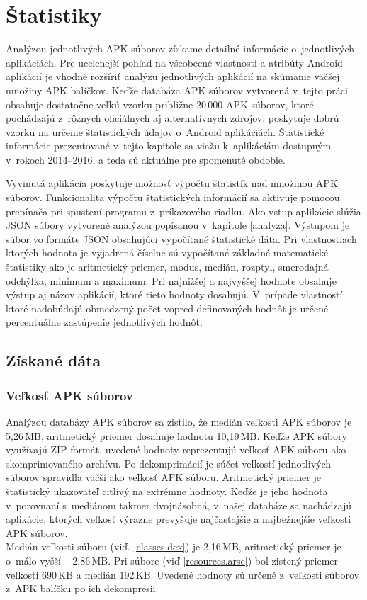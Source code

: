 \chapter{Štatistiky}
\label{statistiky}
Analýzou jednotlivých APK súborov získame detailné informácie o~jednotlivých aplikáciách. Pre ucelenejší pohľad na všeobecné vlastnosti a atribúty Android aplikácií je vhodné rozšíriť analýzu jednotlivých aplikácií na skúmanie väčšej množiny APK balíčkov. Keďže databáza APK súborov vytvorená v~tejto práci obsahuje dostatočne veľkú vzorku približne 20\,000 APK súborov, ktoré pochádzajú z~rôznych oficiálnych aj alternatívnych zdrojov, poskytuje dobrú vzorku na určenie štatistických údajov o~Android aplikáciách. Štatistické informácie prezentované v~tejto kapitole sa viažu k~aplikáciám dostupným v~rokoch 2014--2016, a teda sú aktuálne pre spomenuté obdobie.

Vyvinutá aplikácia  poskytuje možnosť výpočtu štatistík nad množinou APK súborov. Funkcionalita výpočtu štatistických informácií sa aktivuje pomocou prepínača  pri spustení programu z~príkazového riadku. Ako vstup aplikácie slúžia JSON súbory vytvorené analýzou popísanou v~kapitole \ref{analyza}. Výstupom je súbor vo formáte JSON obsahujúci vypočítané štatistické dáta. Pri vlastnostiach ktorých hodnota je vyjadrená číselne sú vypočítané základné matematické štatistiky ako je aritmetický priemer, modus, medián, rozptyl, smerodajná odchýlka, minimum a maximum. Pri najnižšej a najvyššej hodnote obsahuje výstup aj názov aplikácií, ktoré tieto hodnoty dosahujú. V~prípade vlastností ktoré nadobúdajú obmedzený počet vopred definovaných hodnôt je určené percentuálne zastúpenie jednotlivých hodnôt.

\section{Získané dáta}
\subsection{Veľkosť APK súborov}
Analýzou databázy APK súborov sa zistilo, že medián veľkosti APK súborov je 5,26\,MB, aritmetický priemer dosahuje hodnotu 10,19\,MB. Keďže APK súbory využívajú ZIP formát, uvedené hodnoty reprezentujú veľkosť APK súboru ako skomprimovaného archívu. Po dekomprimácií je súčet veľkostí jednotlivých súborov spravidla väčší ako veľkosť APK súboru. Aritmetický priemer je štatistický ukazovateľ citlivý na extrémne hodnoty. Keďže je jeho hodnota v~porovnaní s~mediánom takmer dvojnásobná, v~našej databáze sa nachádzajú aplikácie, ktorých veľkosť výrazne prevyšuje najčastajšie a najbežnejšie veľkosti APK súborov.\\ Medián veľkosti súboru  (viď. \ref{classes.dex}) je 2,16\,MB, aritmetický priemer je o~málo vyšší -- 2,86\,MB. Pri súbore  (viď \ref{resources.arsc}) bol zistený priemer veľkosti 690\,KB a medián 192\,KB. Uvedené hodnoty sú určené z~veľkosti súborov z~APK balíčku po ich dekompresii.

